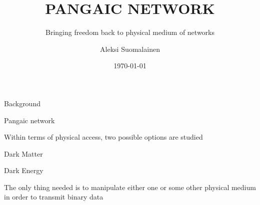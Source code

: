 \documentclass[14pt]{beamer}
\title{PANGAIC NETWORK}
\subtitle{Bringing freedom back to physical medium of networks}
\author{Aleksi Suomalainen}
\institute{locusf.wordress.com}
\date{\today}
\begin{document}
\begin{frame}[plain]
\maketitle
\end{frame}

\begin{frame}{Background}
 \begin{fullpageitemize}
  \item \begin{center}\end{center}
  \item \begin{center}\end{center}
  \item \begin{center}\end{center}
 \end{fullpageitemize}
\end{frame}

\begin{frame}{Pangaic network}
 \begin{fullpageitemize}
\item 
	\begin{center}
Within terms of physical access, two possible options are studied
    \end{center}
\item 
	\begin{center}
Dark Matter
    \end{center}
\item 
	\begin{center}
Dark Energy
    \end{center}

	\begin{center}
The only thing needed is to manipulate either one or some other physical medium in order to transmit binary data
    \end{center}

 \end{fullpageitemize}
\end{frame}
\end{document}
